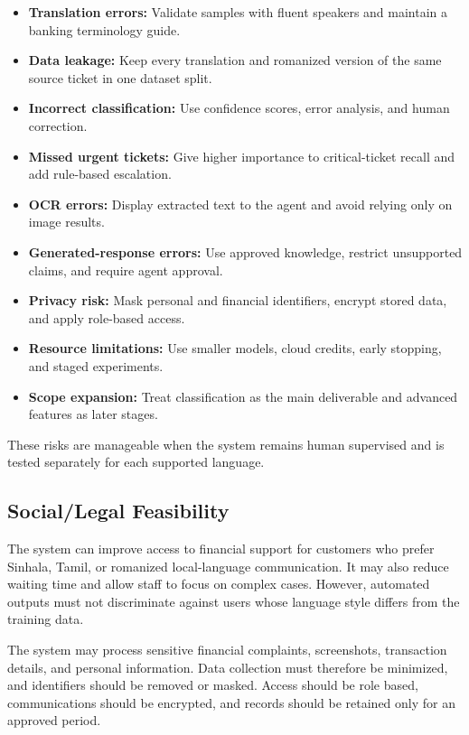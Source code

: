 \documentclass[11pt,a4paper]{article}
\begin{document}
\begin{itemize}
    \item \textbf{Translation errors:} Validate samples with fluent speakers and maintain a banking terminology guide.
    \item \textbf{Data leakage:} Keep every translation and romanized version of the same source ticket in one dataset split.
    \item \textbf{Incorrect classification:} Use confidence scores, error analysis, and human correction.
    \item \textbf{Missed urgent tickets:} Give higher importance to critical-ticket recall and add rule-based escalation.
    \item \textbf{OCR errors:} Display extracted text to the agent and avoid relying only on image results.
    \item \textbf{Generated-response errors:} Use approved knowledge, restrict unsupported claims, and require agent approval.
    \item \textbf{Privacy risk:} Mask personal and financial identifiers, encrypt stored data, and apply role-based access.
    \item \textbf{Resource limitations:} Use smaller models, cloud credits, early stopping, and staged experiments.
    \item \textbf{Scope expansion:} Treat classification as the main deliverable and advanced features as later stages.
\end{itemize}

These risks are manageable when the system remains human supervised and is tested separately for each supported language.

\subsection{Social/Legal Feasibility}

The system can improve access to financial support for customers who prefer Sinhala, Tamil, or romanized local-language communication. It may also reduce waiting time and allow staff to focus on complex cases. However, automated outputs must not discriminate against users whose language style differs from the training data.

The system may process sensitive financial complaints, screenshots, transaction details, and personal information. Data collection must therefore be minimized, and identifiers should be removed or masked. Access should be role based, communications should be encrypted, and records should be retained only for an approved period.
\end{document}
